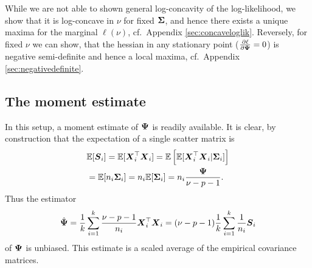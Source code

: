 \documentclass{article}\usepackage[]{graphicx}\usepackage[]{color}
\begin{document}
While we are not able to shown general log-concavity of the log-likelihood, we show that it is log-concave in $\nu$ for fixed ${\boldsymbol{\Sigma}}$, and hence there exists a unique maxima for the marginal $\ell(\nu)$, cf.\ Appendix \ref{sec:concaveloglik}.
Reversely, for fixed $\nu$ we can show, that the hessian in any stationary point ($\frac{\partial\ell}{\partial{\boldsymbol{\Psi}}} = 0$) is negative semi-definite and hence a local maxima, cf.\ Appendix \ref{sec:negativedefinite}.




\subsection{The moment estimate}
In this setup, a moment estimate of ${\boldsymbol{\Psi}}$ is readily available. It is clear, by construction that the expectation of a single scatter matrix is
\begin{align*}
  &\mathbb{E}[ \boldsymbol{S}_i ]
    = \mathbb{E}[{\boldsymbol{X}}_i^\top{\boldsymbol{X}}_i ]
    = \mathbb{E}\left[\mathbb{E}[{\boldsymbol{X}}_i^\top{\boldsymbol{X}}_i | {\boldsymbol{\Sigma}}_i ]\right] \\
    &= \mathbb{E}[n_i {\boldsymbol{\Sigma}}_i]
    = n_i\mathbb{E}[{\boldsymbol{\Sigma}}_i]
    = n_i\frac{{\boldsymbol{\Psi}}}{\nu - p - 1}.
\end{align*}
Thus the estimator
\begin{align}
  \hat{{\boldsymbol{\Psi}}}
  = \frac{1}{k} \sum_{i = 1}^k \frac{\nu - p - 1}{n_i}{\boldsymbol{X}}_i^\top{\boldsymbol{X}}_i
  = (\nu - p - 1) \frac{1}{k} \sum_{i = 1}^k \frac{1}{n_i}{\boldsymbol{S}}_i
  \label{eq:moment}
\end{align}
of ${\boldsymbol{\Psi}}$ is unbiased. This estimate is a scaled average of the empirical covariance matrices.
\end{document}
